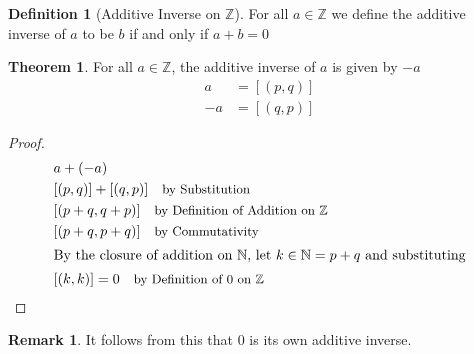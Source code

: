 \documentclass[12pt]{article}
\newcommand{\stext}[1]{\quad\text{\small #1}}
\theoremstyle{definition}
\newtheorem{theorem}{Theorem}
\newtheorem{definition}{Definition}
\newtheorem*{remark}{Remark}
\begin{document}
\begin{definition}[Additive Inverse on $\mathbb{Z}$]
    For all $a \in \mathbb{Z}$ we define the additive inverse of $a$ to be $b$ if and only if $a + b = 0$
\end{definition}
\begin{theorem}
    For all $a \in \mathbb{Z}$, the additive inverse of $a$ is given by $-a$
    \begin{align*}
        a &= [(p, q)] \\ 
        -a &= [(q, p)]
    \end{align*}
\end{theorem}
\begin{proof}
    \begin{align*}
        & a + (-a) \\
        & [(p, q)] + [(q, p)] \stext{by Substitution}\\ 
        & [(p + q, q + p)] \stext{by Definition of Addition on $\mathbb{Z}$}\\ 
        & [(p + q, p + q)] \stext{by Commutativity}\\ 
        \intertext{By the closure of addition on $\mathbb{N}$, let $k \in \mathbb{N} = p + q$ and substituting}
        & [(k, k)] = 0 \stext{by Definition of 0 on $\mathbb{Z}$}
    \end{align*}
\end{proof}
\begin{remark}
    It follows from this that $0$ is its own additive inverse.
\end{remark}
\end{document}
